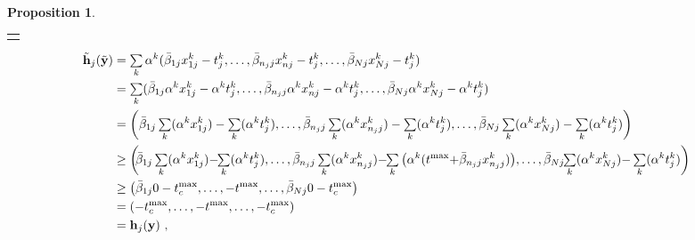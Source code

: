 \documentclass[journal, 10pt, twocolumn]{IEEEtran}
\newtheorem{prop}{Proposition}
\renewcommand{\vec}[1]{\bf{#1}}     \newcommand{\vecsc}[1]{\mbox {\boldmath \scriptsize $#1$}}     \newcommand{\itvec}[1]{\mbox {\boldmath $#1$}}
\newcommand{\hh}{\hspace{-1mm}}
\begin{document}
\begin{prop}
\setcounter{equation}{33}
\begin{table*}[b!]
\normalsize
\vspace{-3mm}
\begin{tabular}{p{17.7cm}} \hline  \\ \end{tabular}
\vspace{-9mm}
\begin{subequations}\label{eq:d_star_equals_D_star}
\begin{align}\label{eq:d_star_equals_D_star1}
\hh\hh\tilde{\vec h}_j(\tilde{\vec y}) & = \mathop{\textstyle{\sum}}_{k}\alpha^k(\bar{\beta}_{1j}x^k_{1j}-t^k_j,\ldots,\bar{\beta}_{n_jj}x^k_{nj}-t^k_j,\ldots,\bar{\beta}_{Nj}x^k_{Nj}-t^k_j)\\ \label{eq:d_star_equals_D_star2}
& =\mathop{\textstyle{\sum}}_{k}(\bar{\beta}_{1j}\alpha^k x^k_{1j}-\alpha^k t^k_j,\ldots,\bar{\beta}_{n_jj}\alpha^k x^k_{nj}-\alpha^k t^k_j,\ldots,
\bar{\beta}_{Nj}\alpha^k x^k_{Nj}-\alpha^k t^k_j)\\ \label{eq:d_star_equals_D_star3}
& =\left(\bar{\beta}_{1j}\mathop{\textstyle{\sum}}_{k}(\alpha^k x^k_{1j})-\mathop{\textstyle{\sum}}_{k}(\alpha^k t^k_j),\ldots,\bar{\beta}_{n_jj}\mathop{\textstyle{\sum}}_{k}(\alpha^k x^k_{n_jj})-\mathop{\textstyle{\sum}}_{k}(\alpha^k t^k_j),\ldots,\bar{\beta}_{Nj}\mathop{\textstyle{\sum}}_{k}(\alpha^k x^k_{Nj})-\mathop{\textstyle{\sum}}_{k}(\alpha^k t^k_j)\right)\\ \label{eq:d_star_equals_D_star4}
& \geq\left(\hh\bar{\beta}_{1j}\mathop{\textstyle{\sum}}_{k}(\alpha^k x^k_{1j}){-}\hh\mathop{\textstyle{\sum}}_{k}(\alpha^k t^k_j),\ldots,\bar{\beta}_{n_jj}\mathop{\textstyle{\sum}}_{k}(\alpha^k  x^k_{n_jj}){-}\hh\mathop{\textstyle{\sum}}_{k}\big(\alpha^k (t^\mathrm{max}{+}\bar{\beta}_{n_jj}{x^k_{n_jj}})\big),\ldots,\bar{\beta}_{Nj}\hh\mathop{\textstyle{\sum}}_{k}(\alpha^k x^k_{Nj}){-}\mathop{\textstyle{\sum}}_{k}(\alpha^k t^k_j)\right)\\ \label{eq:d_star_equals_D_star5}
&\geq\left(\bar{\beta}_{1j}0-t^{\mathrm{max}}_c,\ldots,-t^{\mathrm{max}},\ldots,\bar{\beta}_{Nj} 0-t^{\mathrm{max}}_c\right)\\ \label{eq:d_star_equals_D_star6}
&=\left(-t^{\mathrm{max}}_c,\ldots,-t^{\mathrm{max}},\ldots,-t^{\mathrm{max}}_c\right)\\ \label{eq:d_star_equals_D_star7}
& = {\vec h}_j({\vec y}) \ ,
\end{align}
\end{subequations}
\end{table*}
\setcounter{equation}{27}




\end{prop}
\end{document}
